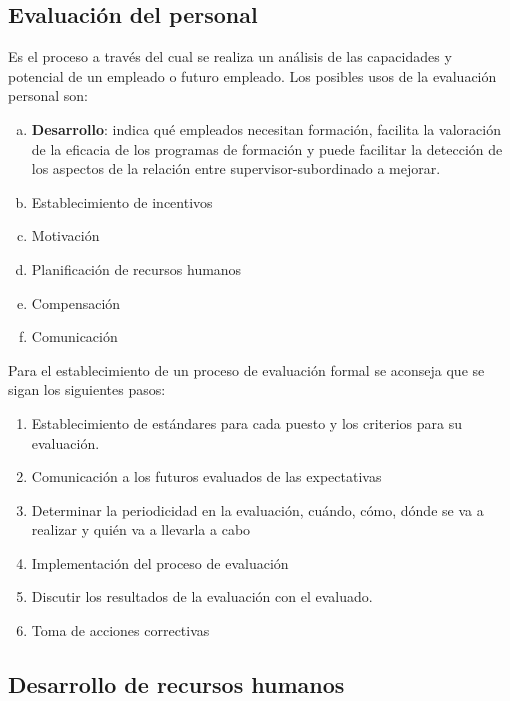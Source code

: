 \documentclass[10pt,a4paper,spanish]{report}
\begin{document}
            \subsection{\textcolor[rgb]{0.8,0.2,0.8}Evaluación del personal}

                  Es el proceso a través del cual se realiza un análisis de las capacidades y potencial de un empleado o futuro empleado. Los posibles usos de la evaluación personal son:
                  \begin{enumerate}[a)]
                        \item \textbf{Desarrollo}: indica qué empleados necesitan formación, facilita la valoración de la eficacia de los programas de formación y puede facilitar la detección de los aspectos de la relación entre supervisor-subordinado a mejorar.
                        \item Establecimiento de incentivos
                        \item Motivación
                        \item Planificación de recursos humanos
                        \item Compensación
                        \item Comunicación
                  \end{enumerate}

                  Para el establecimiento de un proceso de evaluación formal se aconseja que se sigan los siguientes pasos:
                  \begin{enumerate}[1.]
                        \item Establecimiento de estándares para cada puesto y los criterios para su evaluación.
                        \item Comunicación a los futuros evaluados de las expectativas
                        \item Determinar la periodicidad en la evaluación, cuándo, cómo, dónde se va a realizar y quién va a llevarla a cabo
                        \item Implementación del proceso de evaluación
                        \item Discutir los resultados de la evaluación con el evaluado.
                        \item Toma de acciones correctivas
                  \end{enumerate}

            \subsection{\textcolor[rgb]{0.8,0.2,0.8}Desarrollo de recursos humanos}
\end{document}
